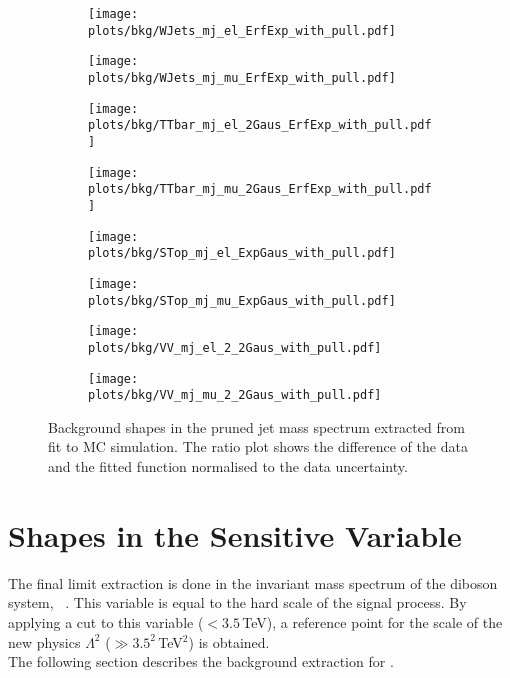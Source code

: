 \begin{figure}
	\centering
	\begin{subfigure}{0.45\textwidth}
		\texttt{[image: plots/bkg/WJets\_mj\_el\_ErfExp\_with\_pull.pdf]}
	\end{subfigure}
	\begin{subfigure}{0.45\textwidth}
		\texttt{[image: plots/bkg/WJets\_mj\_mu\_ErfExp\_with\_pull.pdf]}
	\end{subfigure}
	\begin{subfigure}{0.45\textwidth}
		\texttt{[image: plots/bkg/TTbar\_mj\_el\_2Gaus\_ErfExp\_with\_pull.pdf]}
	\end{subfigure}
	\begin{subfigure}{0.45\textwidth}
		\texttt{[image: plots/bkg/TTbar\_mj\_mu\_2Gaus\_ErfExp\_with\_pull.pdf]}
	\end{subfigure}
	\begin{subfigure}{0.45\textwidth}
		\texttt{[image: plots/bkg/STop\_mj\_el\_ExpGaus\_with\_pull.pdf]}
	\end{subfigure}
	\begin{subfigure}{0.45\textwidth}
		\texttt{[image: plots/bkg/STop\_mj\_mu\_ExpGaus\_with\_pull.pdf]}
	\end{subfigure}
	\begin{subfigure}{0.45\textwidth}
		\texttt{[image: plots/bkg/VV\_mj\_el\_2\_2Gaus\_with\_pull.pdf]}
	\end{subfigure}
	\begin{subfigure}{0.45\textwidth}
		\texttt{[image: plots/bkg/VV\_mj\_mu\_2\_2Gaus\_with\_pull.pdf]}
	\end{subfigure}
	\caption[Background shapes in the pruned jet mass spectrum]{Background shapes in the pruned jet mass spectrum extracted from fit to MC simulation. The ratio plot shows the difference of the data and the fitted function normalised to the data uncertainty.}
	\label{fig:bkg:mjMC}
\end{figure}



\section{Shapes in the Sensitive Variable}
The final limit extraction is done in the invariant mass spectrum of the diboson system, \MWV \ . This variable is equal to the hard scale of the signal process. By applying a cut to this variable ($<3.5$\,TeV), a reference point for the scale of the new physics $\Lambda^2$ ($\gg3.5^2$\,TeV$^2$) is obtained. \\
The following section describes the background extraction for \MWV .

